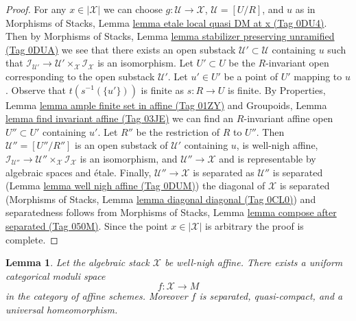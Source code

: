 \documentclass{amsart}
\theoremstyle{plain}
\newtheorem{lemma}[subsection]{Lemma}
\theoremstyle{definition}
\theoremstyle{remark}
\numberwithin{equation}{subsection}
\begin{document}
\begin{proof}
For any $x \in |\mathcal{X}|$ we can choose
$g : \mathcal{U} \to \mathcal{X}$, $\mathcal{U} = [U/R]$, and $u$ as in
Morphisms of Stacks,
Lemma \href{https://stacks.math.columbia.edu/tag/0DU4}{lemma etale local quasi DM at x (Tag 0DU4)}.
Then by
Morphisms of Stacks, Lemma
\href{https://stacks.math.columbia.edu/tag/0DUA}{lemma stabilizer preserving unramified (Tag 0DUA)}
we see that there exists an open substack
$\mathcal{U}' \subset \mathcal{U}$ containing $u$
such that $\mathcal{I}_{\mathcal{U}'} \to
\mathcal{U}' \times_\mathcal{X} \mathcal{I}_\mathcal{X}$
is an isomorphism.
Let $U' \subset U$ be the $R$-invariant open corresponding to
the open substack $\mathcal{U}'$.
Let $u' \in U'$ be a point of $U'$ mapping to $u$.
Observe that $t(s^{-1}(\{u'\}))$ is finite as $s : R \to U$ is finite.
By Properties, Lemma \href{https://stacks.math.columbia.edu/tag/01ZY}{lemma ample finite set in affine (Tag 01ZY)}
and Groupoids, Lemma \href{https://stacks.math.columbia.edu/tag/03JE}{lemma find invariant affine (Tag 03JE)}
we can find an $R$-invariant affine open $U'' \subset U'$
containing $u'$. Let $R''$ be the restriction of $R$ to $U''$.
Then $\mathcal{U}'' = [U''/R'']$ is an open substack of
$\mathcal{U}'$ containing $u$, is well-nigh affine,
$\mathcal{I}_{\mathcal{U}''} \to
\mathcal{U}'' \times_\mathcal{X} \mathcal{I}_\mathcal{X}$
is an isomorphism, and $\mathcal{U}'' \to \mathcal{X}$
and is representable by algebraic spaces and \'etale.
Finally, $\mathcal{U}'' \to \mathcal{X}$ is separated as
$\mathcal{U}''$ is separated (Lemma \href{https://stacks.math.columbia.edu/tag/0DUM}{lemma well nigh affine (Tag 0DUM)})
the diagonal of $\mathcal{X}$ is separated
(Morphisms of Stacks, Lemma \href{https://stacks.math.columbia.edu/tag/0CL0}{lemma diagonal diagonal (Tag 0CL0)})
and separatedness follows from Morphisms of Stacks, Lemma
\href{https://stacks.math.columbia.edu/tag/050M}{lemma compose after separated (Tag 050M)}.
Since the point $x \in |\mathcal{X}|$ is arbitrary the proof is complete.
\end{proof}


\begin{lemma}
\label{lemma-well-nigh-affine-moduli-space}
Let the algebraic stack $\mathcal{X}$ be well-nigh affine. There exists
a uniform categorical moduli space
$$
f : \mathcal{X} \longrightarrow M
$$
in the category of affine schemes. Moreover
$f$ is separated, quasi-compact, and a universal homeomorphism.
\end{lemma}
\end{document}
